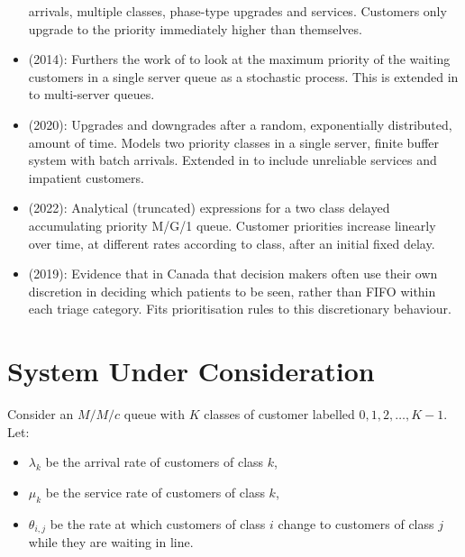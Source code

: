 \documentclass{article}
\begin{document}
\begin{itemize}
      arrivals, multiple classes, phase-type upgrades and services.
        Customers only upgrade to the priority immediately higher than
        themselves.
  \item \cite{stanford14} (2014): Furthers the work of \cite{kleinrock164} to
      look at the maximum priority of the waiting customers in a single server
        queue as a stochastic process. This is extended in \cite{sharif14} to
        multi-server queues.
  \item \cite{klimenok20} (2020): Upgrades and downgrades after a random,
      exponentially distributed, amount of time. Models two priority classes
        in a single server, finite buffer system with batch arrivals. Extended
        in \cite{dudin21} to include unreliable services and impatient
        customers. 
  \item \cite{bilodeau22} (2022): Analytical (truncated) expressions for
      a two class delayed accumulating priority M/G/1 queue. Customer
        priorities increase linearly over time, at different rates
        according to class, after an initial fixed delay.
\end{itemize}


\begin{itemize}
  \item \cite{ding19} (2019): Evidence that in Canada that decision makers
      often use their own discretion in deciding which patients to be seen,
        rather than FIFO within each triage category. Fits prioritisation rules
        to this discretionary behaviour.
\end{itemize}




\section{System Under Consideration}\label{sec:system}
Consider an $M/M/c$ queue with $K$ classes of customer labelled
$0, 1, 2, \dots, K-1$.
Let:

\begin{itemize}
  \item $\lambda_k$ be the arrival rate of customers of class $k$,
  \item $\mu_k$ be the service rate of customers of class $k$,
  \item $\theta_{i,j}$ be the rate at which customers of class $i$ change
  to customers of class $j$ while they are waiting in line.
\end{itemize}
\end{document}
